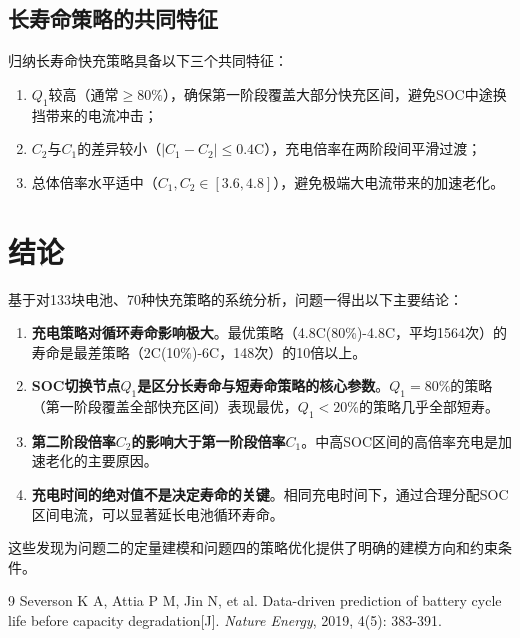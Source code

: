 \documentclass[withoutpreface]{cumcmthesis}
\begin{document}
\subsection{长寿命策略的共同特征}

归纳长寿命快充策略具备以下三个共同特征：
\begin{enumerate}
    \item $Q_1$较高（通常$\geq 80\%$），确保第一阶段覆盖大部分快充区间，避免SOC中途换挡带来的电流冲击；
    \item $C_2$与$C_1$的差异较小（$|C_1 - C_2| \leq 0.4$C），充电倍率在两阶段间平滑过渡；
    \item 总体倍率水平适中（$C_1, C_2 \in [3.6, 4.8]$），避免极端大电流带来的加速老化。
\end{enumerate}

\section{结论}

基于对133块电池、70种快充策略的系统分析，问题一得出以下主要结论：

\begin{enumerate}
    \item \textbf{充电策略对循环寿命影响极大}。最优策略（4.8C(80\%)-4.8C，平均1564次）的寿命是最差策略（2C(10\%)-6C，148次）的10倍以上。
    \item \textbf{SOC切换节点$Q_1$是区分长寿命与短寿命策略的核心参数}。$Q_1=80\%$的策略（第一阶段覆盖全部快充区间）表现最优，$Q_1 < 20\%$的策略几乎全部短寿。
    \item \textbf{第二阶段倍率$C_2$的影响大于第一阶段倍率$C_1$}。中高SOC区间的高倍率充电是加速老化的主要原因。
    \item \textbf{充电时间的绝对值不是决定寿命的关键}。相同充电时间下，通过合理分配SOC区间电流，可以显著延长电池循环寿命。
\end{enumerate}

这些发现为问题二的定量建模和问题四的策略优化提供了明确的建模方向和约束条件。

\begin{thebibliography}{9}
Severson K A, Attia P M, Jin N, et al.
Data-driven prediction of battery cycle life before capacity degradation[J].
\textit{Nature Energy}, 2019, 4(5): 383-391.
\end{thebibliography}
\end{document}
